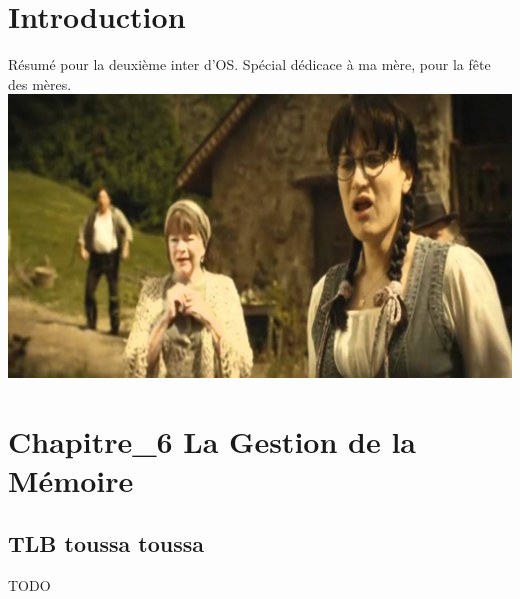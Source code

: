     
    
    
    
    

\section{Introduction}
Résumé pour la deuxième inter d'OS. Spécial dédicace à ma mère, pour la fête des mères.\\[5.5cm]
\includegraphics[scale=.35]{Img/0.PNG}
\newpage
\section{Chapitre\_6 La Gestion de la Mémoire}
\subsection{TLB toussa toussa}
TODO
